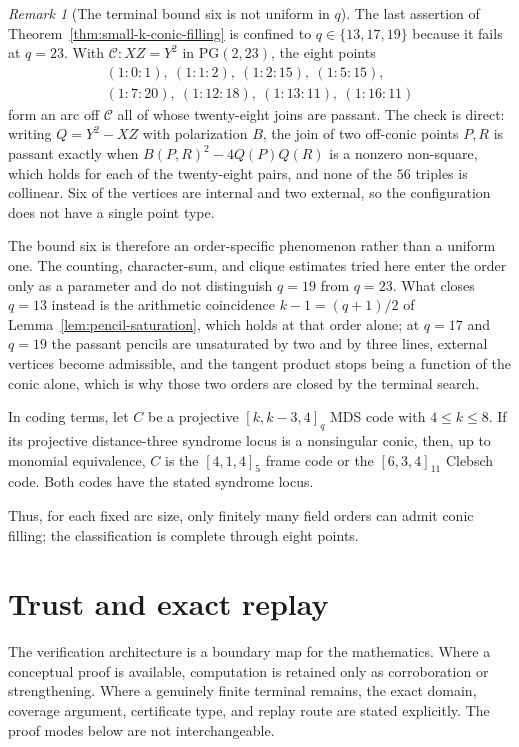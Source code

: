 \documentclass[11pt]{article}
\theoremstyle{remark}
\newtheorem{remark}[theorem]{Remark}
\newcommand{\PG}{\mathrm{PG}}
\newcommand{\cC}{\mathcal{C}}
\begin{document}
\begin{remark}[The terminal bound six is not uniform in $q$]
\label{rem:q23-passant-arc}
The last assertion of Theorem~\ref{thm:small-k-conic-filling} is confined to
$q\in\{13,17,19\}$ because it fails at $q=23$.  With $\cC:XZ=Y^2$ in
$\PG(2,23)$, the eight points
\[
\begin{gathered}
(1{:}0{:}1),\ (1{:}1{:}2),\ (1{:}2{:}15),\ (1{:}5{:}15),\\
(1{:}7{:}20),\ (1{:}12{:}18),\ (1{:}13{:}11),\ (1{:}16{:}11)
\end{gathered}
\]
form an arc off $\cC$ all of whose twenty-eight joins are passant.  The
check is direct: writing $Q=Y^2-XZ$ with polarization $B$, the join of two
off-conic points $P,R$ is passant exactly when
$B(P,R)^2-4Q(P)Q(R)$ is a nonzero non-square, which holds for each of the
twenty-eight pairs, and none of the $56$ triples is collinear.  Six of the
vertices are internal and two external, so the configuration does not have
a single point type.

The bound six is therefore an order-specific phenomenon rather than a
uniform one.  The counting, character-sum, and clique estimates tried here
enter the order only as a parameter and do not distinguish $q=19$ from
$q=23$.  What closes $q=13$ instead is the arithmetic coincidence
$k-1=(q+1)/2$ of Lemma~\ref{lem:pencil-saturation}, which holds at that
order alone; at $q=17$ and $q=19$ the passant pencils are unsaturated by
two and by three lines, external vertices become admissible, and the
tangent product stops being a function of the conic alone, which is why
those two orders are closed by the terminal search.
\end{remark}

In coding terms, let $C$ be a projective $[k,k-3,4]_q$ MDS code with
$4\le k\le8$. If its projective distance-three syndrome locus is a
nonsingular conic, then, up to monomial equivalence, $C$ is the
$[4,1,4]_5$ frame code or the $[6,3,4]_{11}$ Clebsch code. Both codes have
the stated syndrome locus.

Thus, for each fixed arc size, only finitely many field orders can admit
conic filling; the classification is complete through eight points.

\section{Trust and exact replay}
\label{sec:verification}

The verification architecture is a boundary map for the mathematics.  Where
a conceptual proof is available, computation is retained only as corroboration
or strengthening.  Where a genuinely finite terminal remains, the exact
domain, coverage argument, certificate type, and replay route are stated
explicitly.  The proof modes below are not interchangeable.
\end{document}
